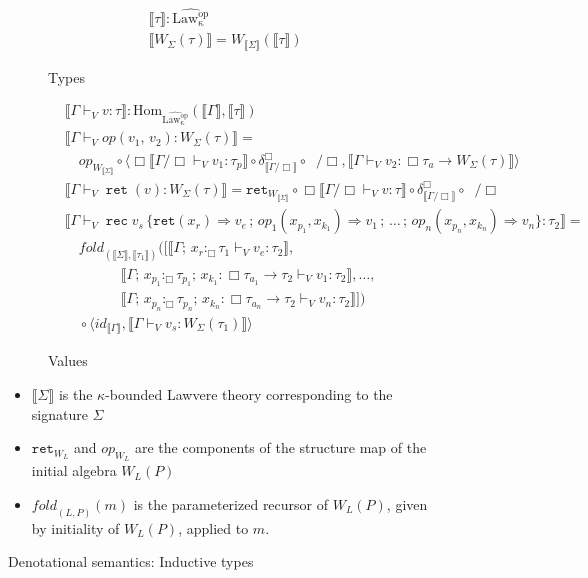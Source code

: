 \documentclass[acmsmall, screen, review, anonymous]{acmart}
\theoremstyle{definition}
\newcommand{\glob}{\mathop{\Box}}
\newcommand{\arr}{\rightarrow}
\newcommand{\lawcop}{\mathrm{Law_{\kappa}^{op}}}
\newcommand{\pshlawcop}{\widehat{\lawcop}}
\newcommand{\homset}[3]{\mathrm{Hom}_{#1}(#2, #3)}
\newcommand{\sem}[1]{\llbracket #1 \rrbracket}
\newcommand{\comult}[1]{\delta^{#1}}
\newcommand{\ind}[1]{W_{#1}}
\newcommand{\indintro}[3]{{#1}(#2,\, #3)}
\newcommand{\retname}{\mathtt{ret}}
\newcommand{\ret}[1]{\mathop{\retname}(#1)}
\newcommand{\indelimname}{\mathtt{rec}}
\newcommand{\indelim}[2]{\mathop{\indelimname} #1 \,\{#2\}}
\newcommand{\indretcase}[2]{\retname(#1) \Rightarrow #2}
\newcommand{\indcase}[4]{#1(#2, #3) \Rightarrow #4}
\newcommand{\seq}{\,;\,}
\newcommand{\retcw}[1]{\retname_{\ind{#1}}}
\newcommand{\opcw}[2]{{#1}_{\ind{#2}}}
\newcommand{\foldc}[3]{\mathit{fold}_{(#1, #2)}(#3)}
\newcommand{\types}{\mathrel{:}}
\newcommand{\gtypes}{\mathrel{:_{\Box}}}
\newcommand{\ccons}[2]{#1;\,#2}
\newcommand{\lbind}[3]{\ccons{#1}{#2\types#3}}
\newcommand{\gbind}[3]{\ccons{#1}{#2\gtypes#3}}
\newcommand{\cdiv}[1]{#1/\Box}
\newcommand{\bdiv}[1]{\cdiv{\mathop{!_{#1}}}}
\newcommand{\turnv}{\mathrel{\vdash_V}}
\begin{document}
\begin{figure}
\begin{subfigure}{\textwidth}
\begin{align*}
&\sem{\tau} \mathrel{:} \pshlawcop \\
&\sem{\ind{\Sigma}(\tau)} = \ind{\sem{\Sigma}}(\sem{\tau})
\end{align*}
\caption{Types}
\end{subfigure}

\begin{subfigure}{\textwidth}
\begin{align*}
&\sem{\Gamma \turnv v \types \tau} \mathrel{:} \homset{\pshlawcop}{\sem{\Gamma}}{\sem{\tau}} \\
&\sem{\Gamma \turnv \indintro{op}{v_1}{v_2} \types \ind{\Sigma}(\tau)} = {} \\
&\quad \opcw{op}{\sem{\Sigma}}
  \circ \langle \glob \sem{\cdiv{\Gamma} \turnv v_1 \types \tau_p}
                \circ \comult{\glob}_{\sem{\cdiv{\Gamma}}} \circ \bdiv{\Gamma},
                \sem{\Gamma \turnv v_2 \types \glob \tau_a \arr \ind{\Sigma}(\tau)} \rangle \\
&\sem{\Gamma \turnv \ret{v} \types \ind{\Sigma}(\tau)} =
  \retcw{\sem{\Sigma}}
  \circ \glob \sem{\cdiv{\Gamma} \turnv v \types \tau}
  \circ \comult{\glob}_{\sem{\cdiv{\Gamma}}} \circ \bdiv{\Gamma} \\
&\sem{\Gamma \turnv \indelim{v_s}{\indretcase{x_r}{v_e} \seq
                                   \indcase{op_1}{x_{p_1}}{x_{k_1}}{v_1} \seq \ldots \seq
                                   \indcase{op_n}{x_{p_n}}{x_{k_n}}{v_n}} \types \tau_2} = {} \\
&\quad \foldc{\sem{\Sigma}}{\sem{\tau_1}}
       {[\sem{\gbind{\Gamma}{x_r}{\tau_1} \turnv v_e \types \tau_2}, \\
&\qquad\qquad
       \sem{\lbind{\gbind{\Gamma}{x_{p_1}}{\tau_{p_1}}}{x_{k_1}}{\glob \tau_{a_1} \arr \tau_2} \turnv v_1 \types \tau_2} , \ldots , \\
&\qquad\qquad
       \sem{\lbind{\gbind{\Gamma}{x_{p_n}}{\tau_{p_n}}}{x_{k_n}}{\glob \tau_{a_n} \arr \tau_2} \turnv v_n \types \tau_2}]} \\
&\quad \circ \langle id_{\sem{\Gamma}},
       \sem{\Gamma \turnv v_s \types \ind{\Sigma}(\tau_1)} \rangle
\end{align*}
\caption{Values}
\end{subfigure}

\begin{itemize}
\item $\sem{\Sigma}$ is the $\kappa$-bounded Lawvere theory corresponding to the
  signature $\Sigma$
\item $\retcw{L}$ and $\opcw{op}{L}$ are the components of the structure
  map of the initial algebra $\ind{L}(P)$
\item $\foldc{L}{P}{m}$ is the parameterized recursor of $\ind{L}(P)$,
  given by initiality of $\ind{L}(P)$, applied to $m$.
\end{itemize}
\caption{Denotational semantics: Inductive types}
\label{fig:denotational-inductive}
\end{figure}
\end{document}
